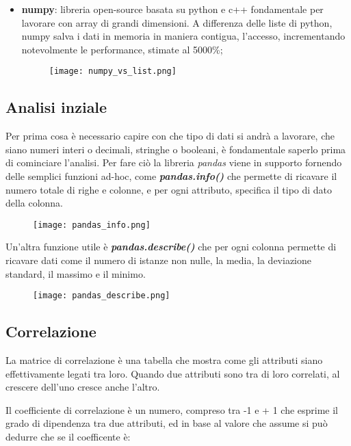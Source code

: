 \documentclass[12pt,a4paper]{article}
\begin{document}
\begin{itemize}
    \item \textbf{numpy}: libreria open-source basata su python e c++ fondamentale per lavorare con array di grandi dimensioni. A differenza delle liste di python, numpy salva i dati in memoria in maniera contigua, l'accesso, incrementando notevolmente le performance, stimate al 5000\%;
    \begin{figure}[h]
        \texttt{[image: numpy\_vs\_list.png]}
        \caption{}
    \end{figure}

\end{itemize}

\clearpage
\subsection{Analisi inziale}
Per prima cosa è necessario capire con che tipo di dati si andrà a lavorare, che siano numeri interi o decimali, stringhe o booleani, è fondamentale saperlo prima di cominciare l'analisi.
Per fare ciò la libreria \textit{pandas} viene in supporto fornendo delle semplici funzioni ad-hoc, come\textbf{ \textit{pandas.info()}} che permette di ricavare il numero totale di righe e colonne, e per ogni attributo, specifica il tipo di dato della colonna.
\begin{figure}[h]
    \texttt{[image: pandas\_info.png]}
    \caption{}
\end{figure}
Un'altra funzione utile è \textit{\textbf{pandas.describe()}} che per ogni colonna permette di ricavare dati come il numero di istanze non nulle, la media, la deviazione standard, il massimo e il minimo.

\begin{figure}[h]
    \texttt{[image: pandas\_describe.png]}
    \caption{}
\end{figure}

\subsection{Correlazione}
La matrice di correlazione è una tabella che mostra come gli attributi  siano effettivamente legati tra loro. Quando due attributi sono tra di loro correlati, al crescere dell’uno cresce anche l’altro.

Il coefficiente di correlazione è un numero, compreso tra -1 e + 1 che esprime il grado di dipendenza tra due attributi, ed in base al valore che assume si può dedurre che se il coefficente è:
\end{document}

